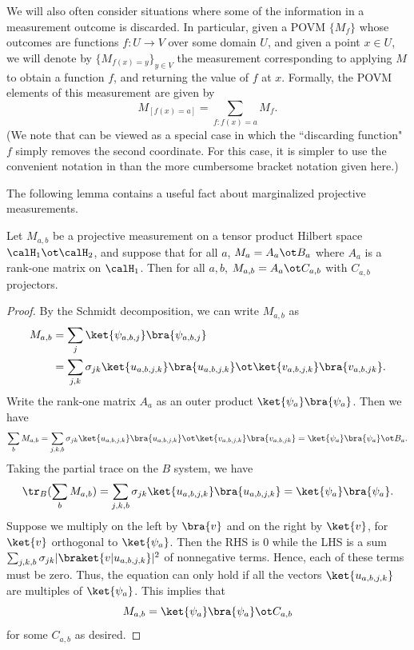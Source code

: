 \begin{notation}\label{not:marginalize}
We will also often consider situations where some of the information
in a measurement outcome is discarded. In particular, given a
POVM $\{M_f\}$ whose outcomes are functions $f:U \to V$ over some
domain $U$, and given a point $x \in U$, we will denote by $\{M_{f(x)=
  y}\}_{y \in V}$ the measurement corresponding to applying $M$ to
obtain a function $f$, and returning the value of $f$ at
$x$. Formally, the POVM elements of this measurement are given by
\[ M_{[f(x) = a]} = \sum_{f: f(x) = a} M_f. \]
(We note that  can be viewed as a special case
in which the ``discarding function"~$f$ simply removes the second coordinate.
For this case, it is simpler to use the convenient notation in 
than the more cumbersome bracket notation given here.)
\end{notation}

The following lemma contains a useful fact about marginalized
projective measurements.
\begin{lemma}\label{lem:marginal-tensor-product}
  Let $M_{a,b}$ be a projective measurement on a tensor product
  Hilbert space $\calH_1 \ot \calH_2$, and suppose that for all $a$, $M_{a} = A_a
  \ot B_a$ where $A_a$ is a rank-one matrix on $\calH_1$. Then for all
  $a, b$, $M_{a,b} = A_a \ot C_{a,b}$ with $C_{a,b}$ projectors.
\end{lemma}
\begin{proof}
  By the Schmidt decomposition, we can write $M_{a,b}$ as
  \begin{align*}
    M_{a,b} &= \sum_j \ket{\psi_{a,b,j}}\bra{\psi_{a,b,j}} \\
    &= \sum_{j,k}  \sigma_{jk}              \ket{u_{a,b,j,k}}\bra{u_{a,b,j,k}}
      \ot\ket{v_{a,b,j,k}}\bra{v_{a,b,jk}}.
  \end{align*}
  Write the rank-one matrix $A_a$ as an outer product
  $\ket{\psi_a}\bra{\psi_a}$. Then we have
  \[ \sum_b M_{a,b} = \sum_{j,k, b} \sigma_{jk}              \ket{u_{a,b,j,k}}\bra{u_{a,b,j,k}}
      \ot\ket{v_{a,b,j,k}}\bra{v_{a,b,jk}} = 
      \ket{\psi_a}\bra{\psi_a} \ot B_a. \]
    Taking the partial trace on the $B$ system, we have
    \[  \tr_B(\sum_b M_{a,b}) = \sum_{j,k,b} \sigma_{jk}
      \ket{u_{a,b,j,k}}\bra{u_{a,b,j,k}} =
      \ket{\psi_a}\bra{\psi_a}. \]
    Suppose we multiply on the left by $\bra{v}$ and on the right by
    $\ket{v}$, for $\ket{v}$ orthogonal to $\ket{\psi_a}$. Then the
    RHS is 0 while the LHS is a sum $\sum_{j,k,b} \sigma_{jk}
    |\braket{v |u_{a,b,j,k}}|^2$ of nonnegative terms. Hence, each of
    these terms must be zero. Thus, the equation can only hold if all
    the vectors $\ket{u_{a,b,j,k}}$ are multiples of
    $\ket{\psi_a}$. This implies that
    \[ M_{a,b} = \ket{\psi_a} \bra{\psi_a} \ot C_{a,b}\]
    for some $C_{a,b}$ as desired.
\end{proof}

